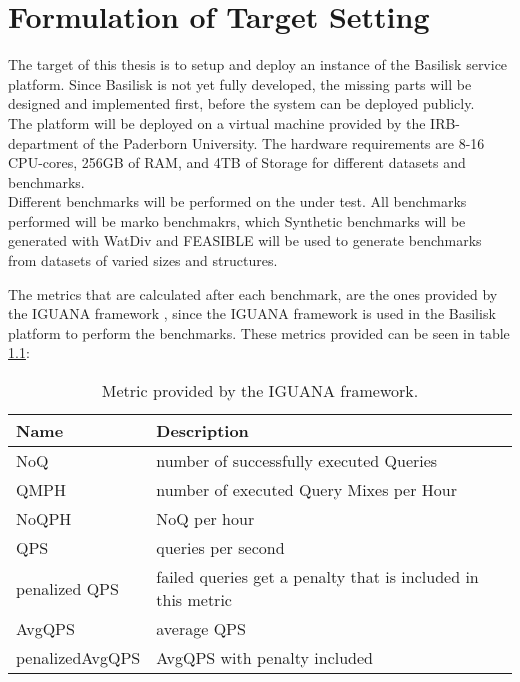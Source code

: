 \chapter{Formulation of Target Setting}
\label{ch:target_setting}

The target of this thesis is to setup and deploy an instance of the Basilisk service platform.
Since Basilisk is not yet fully developed, the missing parts will be designed and implemented first, before the system can be deployed publicly. \\

The platform will be deployed on a virtual machine provided by the IRB-department of the Paderborn University.
The hardware requirements are 8-16 CPU-cores, 256GB of RAM, and 4TB of Storage for different datasets and benchmarks. \\

Different benchmarks will be performed on the \tsp{} under test.
All benchmarks performed will be marko benchmakrs, which 
Synthetic benchmarks will be generated with WatDiv\cite{alucDiversifiedStressTesting2014} and FEASIBLE\cite{saleemFEASIBLEFeatureBasedSPARQL2015} will be used to generate benchmarks from datasets of varied sizes and structures.


The metrics that are calculated after each benchmark, are the ones provided by the IGUANA framework \cite{MetricsIguanaDocumentation}\cite{conradsIguanaGenericFramework2017}, since the IGUANA framework is used in the Basilisk platform to perform the benchmarks.
These metrics provided can be seen in table \ref{table:iguana_metrics}:

\begin{table}[tbhp]
	\begin{tabular}{lp{10cm}}
		\toprule
		Name            & Description                                                  \\ \midrule
		NoQ             & number of successfully executed Queries                      \\
		QMPH            & number of executed Query Mixes per Hour                      \\
		NoQPH           & NoQ per hour                                                 \\
		QPS             & queries per second                                           \\
		penalized QPS   & failed queries get a penalty that is included in this metric \\
		AvgQPS          & average QPS                                                  \\
		penalizedAvgQPS & AvgQPS with penalty included                                 \\ \bottomrule
	\end{tabular}
	\caption{Metric provided by the IGUANA framework\cite{MetricsIguanaDocumentation}.}
	\label{table:iguana_metrics}
\end{table}


